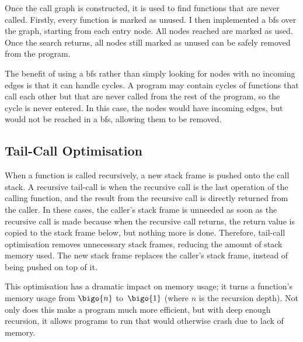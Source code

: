 \documentclass[00-main.tex]{subfiles}
\begin{document}


Once the call graph is constructed, it is used to find functions that are never called.
Firstly, every function is marked as unused.
I then implemented a \gls{bfs} over the graph, starting from each entry node.
All nodes reached are marked as used.
Once the search returns, all nodes still marked as unused can be safely removed from the program.

The benefit of using a \gls{bfs} rather than simply looking for nodes with no incoming edges is that it can handle cycles.
A program may contain cycles of functions that call each other but that are never called from the rest of the program, so the cycle is never entered.
In this case, the nodes would have incoming edges, but would not be reached in a \gls{bfs}, allowing them to be removed.


\subsection{Tail-Call Optimisation}\label{sec:impl:tail-call optimisation}

When a function is called recursively, a new stack frame is pushed onto the call stack.
A recursive tail-call is when the recursive call is the last operation of the calling function, and the result from the recursive call is directly returned from the caller.
In these cases, the caller's stack frame is unneeded as soon as the recursive call is made because when the recursive call returns, the return value is copied to the stack frame below, but nothing more is done.
Therefore, tail-call optimisation removes unnecessary stack frames, reducing the amount of stack memory used.
The new stack frame replaces the caller's stack frame, instead of being pushed on top of it.

This optimisation has a dramatic impact on memory usage; it turns a function's memory usage from $\bigo{n}$ to~$\bigo{1}$ (where $n$ is the recursion depth).
Not only does this make a program much more efficient, but with deep enough recursion, it allows programs to run that would otherwise crash due to lack of memory.
\end{document}
